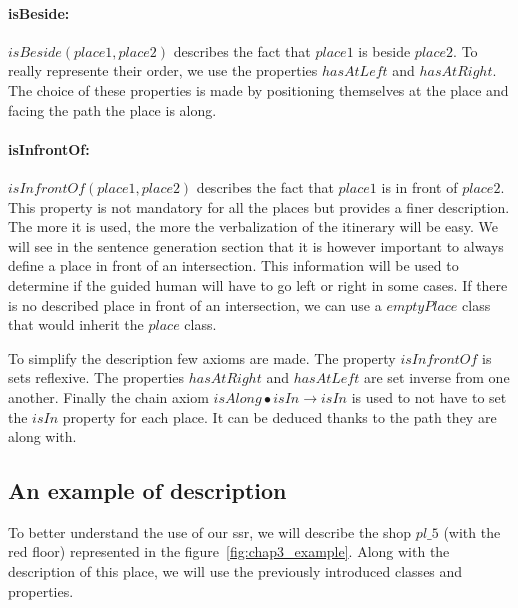 \paragraph{isBeside:} $isBeside(place1,place2)$ describes the fact that $place1$ is beside $place2$. To really represente their order, we use the properties $hasAtLeft$ and $hasAtRight$. The choice of these properties is made by positioning themselves at the place and facing the path the place is along.

\paragraph{isInfrontOf:} $isInfrontOf(place1,place2)$ describes the fact that $place1$ is in front of $place2$. This property is not mandatory for all the places but provides a finer description. The more it is used, the more the verbalization of the itinerary will be easy. We will see in the sentence generation section that it is however important to always define a place in front of an intersection. This information will be used to determine if the guided human will have to go left or right in some cases. If there is no described place in front of an intersection, we can use a $emptyPlace$ class that would inherit the $place$ class.

To simplify the description few axioms are made. The property $isInfrontOf$ is sets reflexive. The properties $hasAtRight$ and $hasAtLeft$ are set inverse from one another. Finally the chain axiom $isAlong \bullet isIn \rightarrow isIn$ is used to not have to set the $isIn$ property for each place. It can be deduced thanks to the path they are along with.

\subsection{An example of description}

To better understand the use of our \acrshort{ssr}, we will describe the shop $pl\_5$ (with the red floor) represented in the figure~\ref{fig:chap3_example}. Along with the description of this place, we will use the previously introduced classes and properties.

